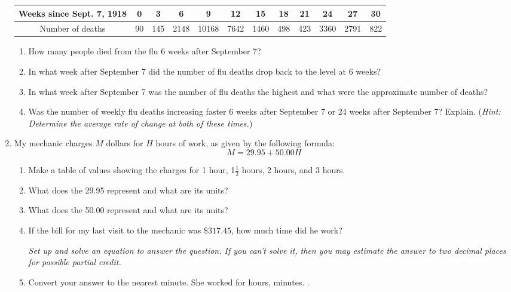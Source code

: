 \documentclass[12pt]{article}
\begin{document}
\begin{enumerate}
\begin{tabular} {|c|c|c|c|c |c|c|c|c|c |c|c|} \hline
Weeks since Sept. 7, 1918 & 0 & 3 & 6  & 9  & 12  & 15  & 18 & 21  & 24  & 27  & 30 \\ \hline
Number of deaths &90 & 145 & 2148 & 10168 & 7642 & 1460 & 498 & 423 & 3360 & 2791 & 822 \\ \hline
\end{tabular}

\begin{enumerate}
\item How many people died from the flu 6 weeks after September 7?
\vfill
\item In what week after September 7 did the number of flu deaths drop back to the level at 6 weeks?
\vfill
\item In what week after September 7 was the number of flu deaths the highest and what were the approximate number of deaths?
\vfill
\item Was the number of weekly flu deaths increasing faster 6 weeks after September 7 or 24 weeks after September 7?  Explain. (\emph{Hint: Determine the average rate of change at both of these times.})
\vfill
\end{enumerate}

\newpage %

\item My mechanic charges $M$ dollars for $H$ hours of work, as given by the following formula:
$$M = 29.95 + 50.00H$$

\begin{enumerate}
\item Make a table of values showing the charges for 1 hour, 1$\frac{1}{2}$ hours, 2 hours, and 3 hours.
\vfill
\item What does the 29.95 represent and what are its units?
\vfill
\item What does the 50.00 represent and what are its units?
\vfill
\item If the bill for my last visit to the mechanic was $\$317.45$, how much time did he work?

\emph{Set up and solve an equation to answer the question.  If you can't solve it, then you may estimate the answer to two decimal places for possible partial credit.}
\vfill
\vfill
\vfill
\item Convert your answer to the nearest minute.
\vfill
She worked for \hrulefill hours, \hrulefill minutes. \hspace{3in}.
\end{enumerate}


\end{enumerate}
\end{document}
